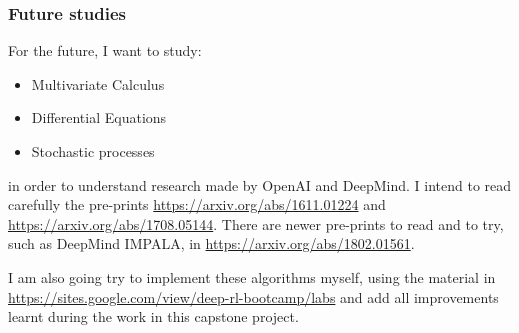 \documentclass[11pt,twoside,a4paper]{article}
\begin{document}
\subsubsection*{Future studies}

For the future, I want to study:

\begin{itemize}
  \item Multivariate Calculus
  \item Differential Equations
  \item Stochastic processes
\end{itemize}

in order to understand research made by OpenAI and DeepMind. I intend to read
carefully the pre-prints \url{https://arxiv.org/abs/1611.01224} and
\url{https://arxiv.org/abs/1708.05144}. There are newer pre-prints to read and
to try, such as DeepMind IMPALA, in \url{https://arxiv.org/abs/1802.01561}.

I am also going try to implement these algorithms myself, using the material in
\url{https://sites.google.com/view/deep-rl-bootcamp/labs} and add all
improvements learnt during the work in this capstone project.



\end{document}
